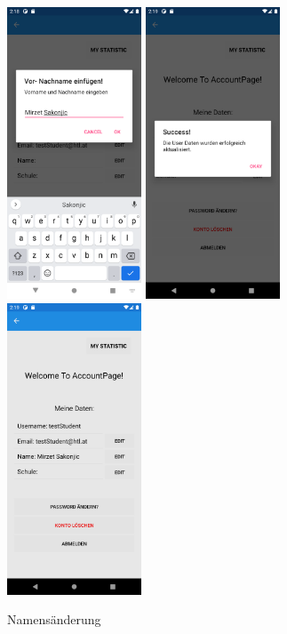 \begin{figure}[h]
    \begin{center}
    \includegraphics[width=4cm]{pics/Xamarin Student/14 Name.png}\hfill
    \includegraphics[width=4cm]{pics/Xamarin Student/15 Name success.png}\hfill
    \includegraphics[width=4cm]{pics/Xamarin Student/16 Name.png}
    \caption[MyAccount]{Namensänderung}
    \end{center}
\end{figure}
